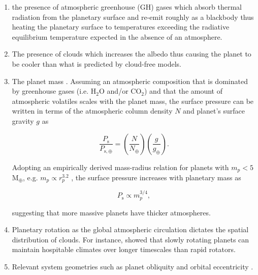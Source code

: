 \begin{enumerate}
\item the presence of atmospheric greenhouse (GH) gases 
\parencite{kasting93, kopparapu13} which 
absorb thermal radiation from the planetary surface and re-emit roughly as a 
blackbody thus heating the planetary surface to temperatures exceeding the 
radiative equilibrium temperature expected in the absence of an atmosphere. 
\item The presence of clouds \parencite{selsis07, yang13} which increases the 
albedo thus causing the planet to be cooler than what is predicted by cloud-free 
models.
\item The planet mass \parencite{kopparapu14}. Assuming an atmospheric composition 
that is dominated by greenhouse gases (i.e. H$_2$O and/or CO$_2$) and that the 
amount of atmospheric volatiles scales with the planet mass, the surface pressure 
can be written in terms of the atmospheric column density $N$ and planet's 
surface gravity $g$ as 

\begin{equation}
\frac{P_{\mathrm{s}}}{P_{\mathrm{s}, \oplus}} = \left( \frac{N}{N_{\oplus}} \right)
\left( \frac{g}{g_{\oplus}} \right).
\end{equation}

\noindent Adopting an empirically derived mass-radius relation for planets with 
$m_p < 5$ M$_{\oplus}$, e.g. $m_p \propto r_p^{3.2}$ \parencite{kopparapu14}, 
the surface pressure increases with planetary mass as 

\begin{equation}
P_{\mathrm{s}} \propto m_p^{3/4}, 
\end{equation}

\noindent suggesting that more massive planets have thicker atmospheres.
\item Planetary rotation as the global atmospheric circulation dictates the 
spatial distribution of clouds. For instance, \parencite{yang14} showed that 
slowly rotating planets can maintain hospitable climates over longer timescales than 
rapid rotators.
\item Relevant system geometries such as planet obliquity 
\parencite{williams97, spiegel08, spiegel09} and orbital eccentricity 
\parencite{dressing10, cowan12}. 
\end{enumerate}

